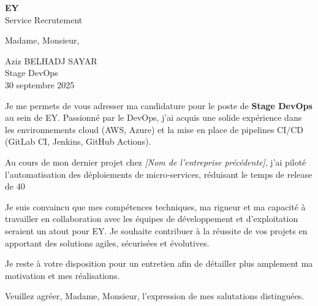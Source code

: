 \documentclass[11pt,a4paper]{letter}
\newcommand{\CandidateName}{Aziz BELHADJ SAYAR}
\newcommand{\CompanyName}{EY}
\newcommand{\Position}{Stage DevOps}
\newcommand{\TodayDate}{30 septembre 2025}
\begin{document}
\begin{letter}{\textbf{\CompanyName}\\Service Recrutement}
\opening{Madame, Monsieur,}

\begin{center}
\colorbox{headerbg}{%
\parbox{\textwidth}{%
\centering
\Huge\textcolor{accent}{\CandidateName}\\[0.3em]
\Large\textcolor{accent}{Stage DevOps}\\[0.3em]
\small\TodayDate
}
}
\end{center}

\vspace{1em}

Je me permets de vous adresser ma candidature pour le poste de \textbf{\Position} au sein de \CompanyName.  
Passionné par le DevOps, j’ai acquis une solide expérience dans les environnements cloud (AWS, Azure) et la mise en place de pipelines CI/CD (GitLab CI, Jenkins, GitHub Actions).  

Au cours de mon dernier projet chez \textit{[Nom de l’entreprise précédente]}, j’ai piloté l’automatisation des déploiements de micro‑services, réduisant le temps de release de 40 %

Je suis convaincu que mes compétences techniques, ma rigueur et ma capacité à travailler en collaboration avec les équipes de développement et d’exploitation seraient un atout pour \CompanyName. Je souhaite contribuer à la réussite de vos projets en apportant des solutions agiles, sécurisées et évolutives.  

Je reste à votre disposition pour un entretien afin de détailler plus amplement ma motivation et mes réalisations.  

\closing{Veuillez agréer, Madame, Monsieur, l’expression de mes salutations distinguées.}

\end{letter}
\end{document}
